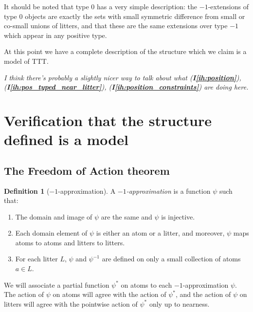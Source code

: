 \documentclass[112pt]{article}
\theoremstyle{definition}
\newtheorem{definition}[theorem]{Definition}
\theoremstyle{remark}
\newcommand{\ihref}[1]{(\textbf{I\ref{#1}})}
\newenvironment{annot}{\begin{center}\color{blue}\sl}{\end{center}}
\begin{document}
   It should be noted that type 0 has a very simple description:  the $-1$-extensions of type 0 objects are exactly the sets with small symmetric difference from small or co-small unions of litters, and that these are the same extensions over type $-1$ which appear in any positive type.


At this point we have a complete description of the structure which we claim is a model of TTT.

\begin{annot}
  I think there's probably a slightly nicer way to talk about what \ihref{ih:position}, \ihref{ih:pos_typed_near_litter}, \ihref{ih:position_constraints} are doing here.
\end{annot}

\newpage

\section{Verification that the structure defined is a model}\label{s:verification}

\subsection{The Freedom of Action theorem}\label{ss:foa}


\begin{definition}[$-1$-approximation]
  A {\em $-1$-approximation\/} is a function $\psi$ such that:
  \begin{enumerate}
    \item The domain and image of $\psi$ are the same and $\psi$ is injective.
    \item Each domain element of $\psi$ is either an atom or a litter, and moreover, $\psi$ maps atoms to atoms and litters to litters.
    \item For each litter $L$, $\psi$ and $\psi^{-1}$ are defined on only a small collection of atoms $a \in L$.
  \end{enumerate}
\end{definition}
We will associate a partial function $\psi^*$ on atoms to each $-1$-approximation $\psi$.
The action of $\psi$ on atoms will agree with the action of $\psi^*$, and the action of $\psi$ on litters will agree with the pointwise action of $\psi^*$ only up to nearness.
\end{document}
